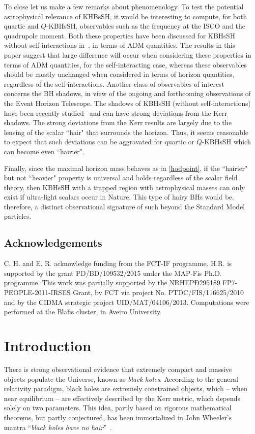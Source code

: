 To close let us make a few remarks about phenomenology. To test the potential astrophysical relevance of KHBsSH, it would be interesting to compute, for both quartic and $Q$-KBHsSH, observables such as the frequency at the ISCO and the quadrupole moment. Both these properties have been discussed for KBHsSH without self-interactions in~\cite{Herdeiro:2014goa,Herdeiro:2015gia}, in terms of ADM quantities. The results in this paper suggest that large difference will occur when considering these properties in terms of ADM quantities, for the self-interacting case, whereas these observables should be mostly unchanged when considered in terms of horizon quantities, regardless of the self-interactions.  Another class of observables of interest concerns the BH shadows, in view of the ongoing and forthcoming observations of the Event Horizon Telescope. The shadows of KBHsSH (without self-interactions) have been recently studied~\cite{Cunha:2015yba} and can have strong deviations from the Kerr shadows. The strong deviations from the Kerr results are largely due to the lensing of the scalar ``hair" that surrounds the horizon. Thus, it seems reasonable to expect that such deviations can be aggravated for quartic or $Q$-KBHsSH which can become even ``hairier".

Finally, since the maximal horizon mass behaves as in \eqref{hodpoint}, if the ``hairier" but not ``heavier" property is universal and holds regardless of the scalar field theory, then KBHsSH with a trapped region with astrophysical masses can only exist if ultra-light scalars occur in Nature. This type of hairy BHs would be, therefore, a distinct observational signature of such beyond the Standard Model particles.



\vspace{0.5cm} 
\noindent
\section*{Acknowledgements}
C. H. and E. R. acknowledge funding from the FCT-IF programme. H.R. is supported by the grant PD/BD/109532/2015 under the MAP-Fis Ph.D. programme. This work was partially supported by the NRHEPÐ295189
FP7-PEOPLE-2011-IRSES Grant, by FCT via project No.
PTDC/FIS/116625/2010 and by the CIDMA strategic project UID/MAT/04106/2013. Computations were performed at the Blafis cluster, in Aveiro University.
 
\chapter{Introduction}
\label{ch:intro}
There is strong observational evidence that extremely compact and massive objects populate the Universe, known as \textit{black holes}.
According to the general relativity paradigm, black holes are extremely constrained objects, which -- when near equilibrium -- are effectively described by the Kerr metric, which depends solely on two parameters.
This idea, partly based on rigorous mathematical theorems, but partly conjectured, has been immortalized in John Wheeler's mantra ``\textit{black holes have no hair}''~\cite{Misner:1974qy}. 
 
